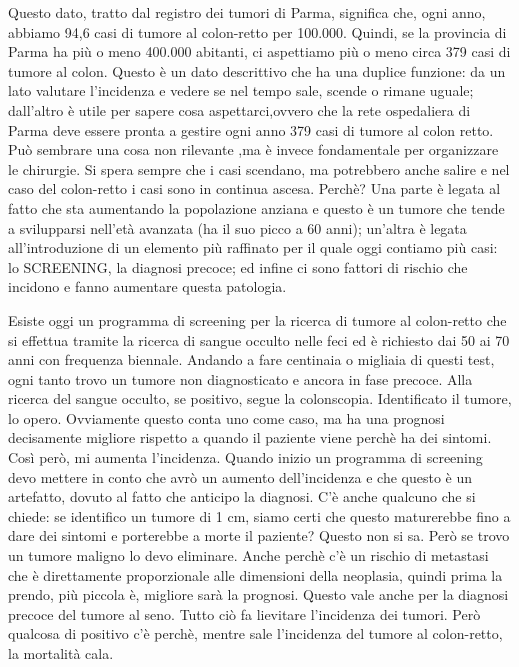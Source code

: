 Questo dato, tratto dal registro dei tumori di Parma, significa che,
ogni anno, abbiamo 94,6 casi di tumore al colon-retto per 100.000.
Quindi, se la provincia di Parma ha più o meno 400.000 abitanti, ci
aspettiamo più o meno circa 379 casi di tumore al colon. Questo è un
dato descrittivo che ha una duplice funzione: da un lato valutare
l'incidenza e vedere se nel tempo sale, scende o rimane uguale;
dall'altro è utile per sapere cosa aspettarci,ovvero che la rete
ospedaliera di Parma deve essere pronta a gestire ogni anno 379 casi di
tumore al colon retto. Può sembrare una cosa non rilevante ,ma è invece
fondamentale per organizzare le chirurgie. Si spera sempre che i casi
scendano, ma potrebbero anche salire e nel caso del colon-retto i casi
sono in continua ascesa. Perchè? Una parte è legata al fatto che sta
aumentando la popolazione anziana e questo è un tumore che tende a
svilupparsi nell'età avanzata (ha il suo picco a 60 anni); un'altra è
legata all'introduzione di un elemento più raffinato per il quale oggi
contiamo più casi: lo SCREENING, la diagnosi precoce; ed infine ci sono
fattori di rischio che incidono e fanno aumentare questa patologia.

Esiste oggi un programma di screening per la ricerca di tumore al
colon-retto che si effettua tramite la ricerca di sangue occulto nelle
feci ed è richiesto dai 50 ai 70 anni con frequenza biennale. Andando a
fare centinaia o migliaia di questi test, ogni tanto trovo un tumore non
diagnosticato e ancora in fase precoce. Alla ricerca del sangue occulto,
se positivo, segue la colonscopia. Identificato il tumore, lo opero.
Ovviamente questo conta uno come caso, ma ha una prognosi decisamente
migliore rispetto a quando il paziente viene perchè ha dei sintomi. Così
però, mi aumenta l'incidenza. Quando inizio un programma di screening
devo mettere in conto che avrò un aumento dell'incidenza e che questo è
un artefatto, dovuto al fatto che anticipo la diagnosi. C'è anche
qualcuno che si chiede: se identifico un tumore di 1 cm, siamo certi che
questo maturerebbe fino a dare dei sintomi e porterebbe a morte il
paziente? Questo non si sa. Però se trovo un tumore maligno lo devo
eliminare. Anche perchè c'è un rischio di metastasi che è direttamente
proporzionale alle dimensioni della neoplasia, quindi prima la prendo,
più piccola è, migliore sarà la prognosi. Questo vale anche per la
diagnosi precoce del tumore al seno. Tutto ciò fa lievitare l'incidenza
dei tumori. Però qualcosa di positivo c'è perchè, mentre sale
l'incidenza del tumore al colon-retto, la mortalità cala.

